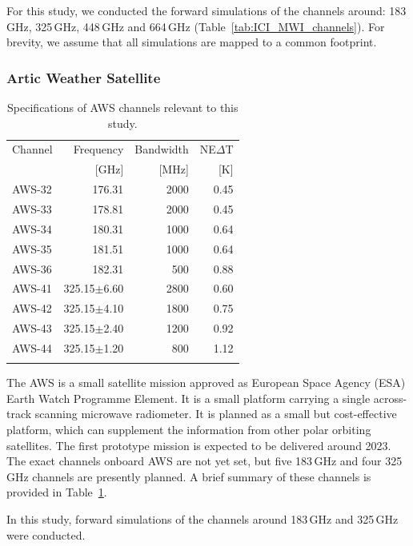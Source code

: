 \documentclass[amt, manuscript]{copernicus}
\begin{document}
For this study, we conducted the forward simulations of the channels around: 183\,GHz, 325\,GHz, 448\,GHz and 664\,GHz (Table~\ref{tab:ICI_MWI_channels}). For brevity, we assume that all simulations are mapped to a common footprint.

\subsubsection{Artic Weather Satellite}
%
\begin{table}[t]
	\caption{Specifications of AWS channels relevant to this study.}
	\label{tab:specifications_AWS}	
	\begin{tabular}{lrrr}
		\tophline
		Channel & Frequency 	& Bandwidth & NE$\Delta$T \\
				& [GHz]			& [MHz]		& [K]		\\
		\middlehline
		AWS-32	&	176.31    & 2000	&	0.45	\\
		AWS-33	&	178.81    & 2000 	&	0.45\\
		AWS-34	&	180.31    & 1000 	&	0.64\\
		AWS-35	&	181.51    & 1000 	&	0.64 \\
		AWS-36	&	182.31    & \phantom{0}500  &	0.88 \\
		AWS-41  & 325.15$\pm$6.60    & 2800 	 &0.60\\
		AWS-42  & 325.15$\pm$4.10    & 1800    &0.75	\\
		AWS-43  & 325.15$\pm$2.40    & 1200    &0.92\\
		AWS-44  & 325.15$\pm$1.20    & \phantom{0}800  &1.12  \\
		\bottomhline
	\end{tabular}
	\belowtable{} %
\end{table}
The AWS is a small satellite mission approved as European Space Agency (ESA) Earth Watch Programme Element. It is a small platform carrying a single across-track scanning microwave radiometer. It is planned as a small but cost-effective platform, which can supplement the information from other polar orbiting satellites. The first prototype mission is expected to be delivered around 2023. The exact channels onboard AWS are not yet set, but five 183\,GHz and four 325\,GHz channels are presently planned. A brief summary of these channels is provided in Table~\ref{tab:specifications_AWS}.
 
In this study, forward simulations of the channels around 183\,GHz and 325\,GHz were conducted. 
\end{document}

